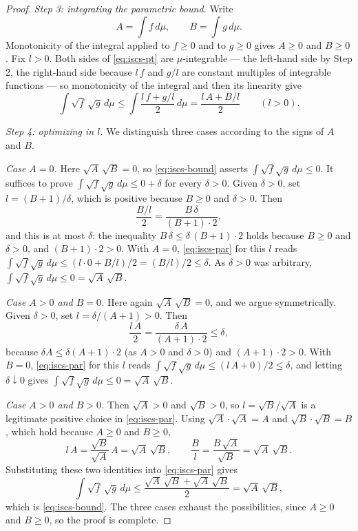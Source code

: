 \begin{proof}
\emph{Step 3: integrating the parametric bound.}
Write
\[
  A=\int f\,d\mu,\qquad B=\int g\,d\mu .
\]
Monotonicity of the integral applied to $f\ge0$ and to $g\ge0$ gives $A\ge0$ and
$B\ge0$. Fix $l>0$. Both sides of \eqref{eq:iscs-pt} are $\mu$-integrable --- the
left-hand side by Step 2, the right-hand side because $l\,f$ and $g/l$ are
constant multiples of integrable functions --- so monotonicity of the integral
and then its linearity give
\begin{equation}\label{eq:iscs-par}
  \int\sqrt{f}\,\sqrt{g}\,d\mu
   \le\int\frac{l\,f+g/l}{2}\,d\mu
   =\frac{l\,A+B/l}{2}
  \qquad(l>0).
\end{equation}

\emph{Step 4: optimizing in $l$.}
We distinguish three cases according to the signs of $A$ and $B$.

\emph{Case $A=0$.} Here $\sqrt A\,\sqrt B=0$, so \eqref{eq:iscs-bound} asserts
$\int\sqrt f\sqrt g\,d\mu\le0$. It suffices to prove
$\int\sqrt f\sqrt g\,d\mu\le0+\delta$ for every $\delta>0$. Given $\delta>0$,
set $l=(B+1)/\delta$, which is positive because $B\ge0$ and $\delta>0$. Then
\[
  \frac{B/l}{2}=\frac{B\,\delta}{(B+1)\cdot2},
\]
and this is at most $\delta$: the inequality
$B\,\delta\le\delta\,(B+1)\cdot 2$ holds because $B\ge0$ and $\delta>0$, and
$(B+1)\cdot2>0$. With $A=0$, \eqref{eq:iscs-par} for this $l$ reads
$\int\sqrt f\sqrt g\,d\mu\le(l\cdot0+B/l)/2=(B/l)/2\le\delta$. As $\delta>0$ was
arbitrary, $\int\sqrt f\sqrt g\,d\mu\le0=\sqrt A\,\sqrt B$.

\emph{Case $A>0$ and $B=0$.} Here again $\sqrt A\,\sqrt B=0$, and we argue
symmetrically. Given $\delta>0$, set $l=\delta/(A+1)>0$. Then
\[
  \frac{l\,A}{2}=\frac{\delta\,A}{(A+1)\cdot2}\le\delta ,
\]
because $\delta A\le\delta(A+1)\cdot2$ (as $A>0$ and $\delta>0$) and
$(A+1)\cdot2>0$. With $B=0$, \eqref{eq:iscs-par} for this $l$ reads
$\int\sqrt f\sqrt g\,d\mu\le(l\,A+0)/2\le\delta$, and letting $\delta\downarrow0$
gives $\int\sqrt f\sqrt g\,d\mu\le0=\sqrt A\,\sqrt B$.

\emph{Case $A>0$ and $B>0$.} Then $\sqrt A>0$ and $\sqrt B>0$, so
$l=\sqrt B/\sqrt A$ is a legitimate positive choice in \eqref{eq:iscs-par}.
Using $\sqrt A\cdot\sqrt A=A$ and $\sqrt B\cdot\sqrt B=B$, which hold because
$A\ge0$ and $B\ge0$,
\[
  l\,A=\frac{\sqrt B}{\sqrt A}\,A=\sqrt A\,\sqrt B,
  \qquad
  \frac{B}{l}=\frac{B\,\sqrt A}{\sqrt B}=\sqrt A\,\sqrt B .
\]
Substituting these two identities into \eqref{eq:iscs-par} gives
\[
  \int\sqrt f\,\sqrt g\,d\mu
   \le\frac{\sqrt A\,\sqrt B+\sqrt A\,\sqrt B}{2}
   =\sqrt A\,\sqrt B ,
\]
which is \eqref{eq:iscs-bound}. The three cases exhaust the possibilities, since
$A\ge0$ and $B\ge0$, so the proof is complete.
\end{proof}
